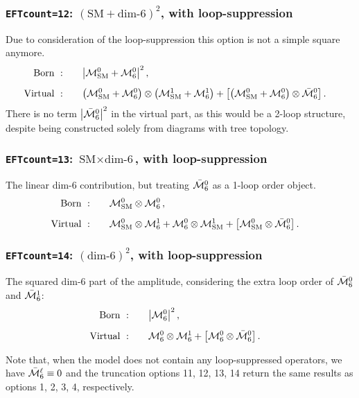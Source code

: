 \subsubsection*{\boldmath\texttt{EFTcount=12}: $(\text{SM}+\text{dim-6})^2$, with loop-suppression}
Due to consideration of the loop-suppression this option is not a simple square anymore.
\begin{align}
    \text{Born }: &\qquad \abs{\mathcal{M}_\mathrm{SM}^0+\mathcal{M}_6^0}^2\,,&\\[5pt]
    \text{Virtual }: &\qquad \qty(\mathcal{M}_\mathrm{SM}^0+\mathcal{M}_6^0)\otimes\qty(\mathcal{M}_\mathrm{SM}^1+\mathcal{M}_6^1) + \qty[\qty(\mathcal{M}_\mathrm{SM}^0+\mathcal{M}_6^0)\otimes\bar{\mathcal{M}}_6^0]\,.&
\end{align}
There is no term $\abs{\bar{\mathcal{M}}_6^0}^2$ in the virtual part, as this would be a 2-loop structure, despite being constructed solely from diagrams with tree topology.

\subsubsection*{\boldmath\texttt{EFTcount=13}: $\text{SM}\times\text{dim-6}$, with loop-suppression}
The linear dim-6 contribution, but treating $\bar{\mathcal{M}}_6^0$ as a 1-loop order object.
\begin{align}
    \text{Born }: &\qquad \mathcal{M}_\mathrm{SM}^0\otimes\mathcal{M}_6^0\,,&\\[5pt]
    \text{Virtual }: &\qquad \mathcal{M}_\mathrm{SM}^0\otimes\mathcal{M}_6^1 + \mathcal{M}_6^0\otimes\mathcal{M}_\mathrm{SM}^1 + \qty[\mathcal{M}_\mathrm{SM}^0\otimes\bar{\mathcal{M}}_6^0]\,.&
\end{align}

\subsubsection*{\boldmath\texttt{EFTcount=14}: $(\text{dim-6})^2$, with loop-suppression}
The squared dim-6 part of the amplitude, considering the extra loop order of $\bar{\mathcal{M}}_6^0$ and $\bar{\mathcal{M}}_6^1$:
\begin{align}
    \text{Born }: &\qquad \abs{\mathcal{M}_6^0}^2\,,&\\[5pt]
    \text{Virtual }: &\qquad \mathcal{M}_6^0\otimes\mathcal{M}_6^1+\qty[\mathcal{M}_6^0\otimes\bar{\mathcal{M}}_6^0]\,.&
\end{align}

Note that, when the model does not contain any loop-suppressed operators, we have $\bar{\mathcal{M}}_6^\ell\equiv0$ and the truncation options 11, 12, 13, 14 return the same results as options 1, 2, 3, 4, respectively.

